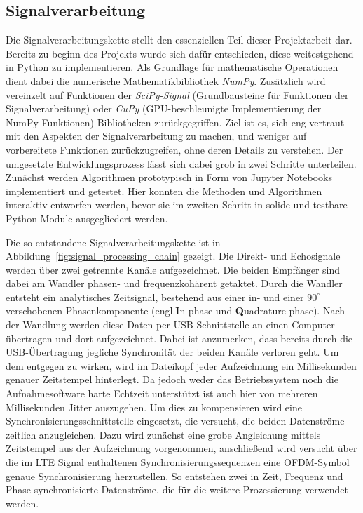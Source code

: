 \subsection{Signalverarbeitung}

Die Signalverarbeitungskette stellt den essenziellen Teil dieser Projektarbeit dar. Bereits zu beginn des Projekts wurde sich dafür entschieden, diese weitestgehend in Python zu implementieren. Als Grundlage für mathematische Operationen dient dabei die numerische Mathematikbibliothek \emph{NumPy}. Zusätzlich wird vereinzelt auf Funktionen der \emph{SciPy-Signal} (Grundbausteine für Funktionen der Signalverarbeitung) oder \emph{CuPy} (GPU-beschleunigte Implementierung der NumPy-Funktionen) Bibliotheken zurückgegriffen. Ziel ist es, sich eng vertraut mit den Aspekten der Signalverarbeitung zu machen, und weniger auf vorbereitete Funktionen zurückzugreifen, ohne deren Details zu verstehen. Der umgesetzte Entwicklungsprozess lässt sich dabei grob in zwei Schritte unterteilen. Zunächst werden Algorithmen prototypisch in Form von Jupyter Notebooks implementiert und getestet. Hier konnten die Methoden und Algorithmen interaktiv entworfen werden, bevor sie im zweiten Schritt in solide und testbare Python Module ausgegliedert werden.

Die so entstandene Signalverarbeitungskette ist in Abbildung~\ref{fig:signal_processing_chain} gezeigt. Die Direkt- und Echosignale werden über zwei getrennte Kanäle aufgezeichnet. Die beiden Empfänger sind dabei am Wandler phasen- und frequenzkohärent getaktet. Durch die Wandler entsteht ein analytisches Zeitsignal, bestehend aus einer in- und einer \(90^\circ \) verschobenen Phasenkomponente %
(engl.\@ \textbf{I}n-phase und \textbf{Q}uadrature-phase). %
Nach der Wandlung werden diese Daten per USB-Schnittstelle an einen Computer übertragen und dort aufgezeichnet. Dabei ist anzumerken, dass bereits durch die USB-Übertragung jegliche Synchronität der beiden Kanäle verloren geht. Um dem entgegen zu wirken, wird im Dateikopf jeder Aufzeichnung ein Millisekunden genauer Zeitstempel hinterlegt. Da jedoch weder das Betriebssystem noch die Aufnahmesoftware harte Echtzeit unterstützt ist auch hier von mehreren Millisekunden Jitter auszugehen. Um dies zu kompensieren wird eine Synchronisierungsschnittstelle eingesetzt, die versucht, die beiden Datenströme zeitlich anzugleichen. Dazu wird zunächst eine grobe Angleichung mittels Zeitstempel aus der Aufzeichnung vorgenommen, anschließend wird versucht über die im LTE Signal enthaltenen Synchronisierungssequenzen eine OFDM-Symbol genaue Synchronisierung herzustellen. So entstehen zwei in Zeit, Frequenz und Phase synchronisierte Datenströme, die für die weitere Prozessierung verwendet werden.

